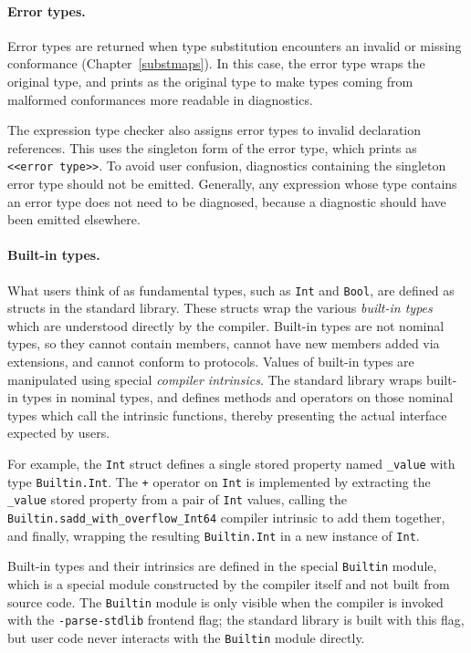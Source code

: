 \documentclass[../generics]{subfiles}
\begin{document}
\paragraph{Error types.}
Error types are returned when type substitution encounters an invalid or missing conformance (Chapter~\ref{substmaps}). In this case, the error type wraps the original type, and prints as the original type to make types coming from malformed conformances more readable in diagnostics.

The expression type checker also assigns error types to invalid declaration references. This uses the singleton form of the error type, which prints as \texttt{<<error~type>>}. To avoid user confusion, diagnostics containing the singleton error type should not be emitted. Generally, any expression whose type contains an error type does not need to be diagnosed, because a diagnostic should have been emitted elsewhere.

\paragraph{Built-in types.}
What users think of as fundamental types, such as \texttt{Int} and \texttt{Bool}, are defined as structs in the standard library. These structs wrap the various \emph{built-in types} which are understood directly by the compiler. Built-in types are not nominal types, so they cannot contain members, cannot have new members added via extensions, and cannot conform to protocols. Values of built-in types are manipulated using special \emph{compiler intrinsics}. The standard library wraps built-in types in nominal types, and defines methods and operators on those nominal types which call the intrinsic functions, thereby presenting the actual interface expected by users.

For example, the \texttt{Int} struct defines a single stored property named \texttt{\_value} with type \texttt{Builtin.Int}. The \texttt{+} operator on \texttt{Int} is implemented by extracting the \texttt{\_value} stored property from a pair of \texttt{Int} values, calling the \texttt{Builtin.sadd\_with\_overflow\_Int64} compiler intrinsic to add them together, and finally, wrapping the resulting \texttt{Builtin.Int} in a new instance of \texttt{Int}.

Built-in types and their intrinsics are defined in the special \texttt{Builtin} module, which is a special module constructed by the compiler itself and not built from source code. The \texttt{Builtin} module is only visible when the compiler is invoked with the \texttt{-parse-stdlib} frontend flag; the standard library is built with this flag, but user code never interacts with the \texttt{Builtin} module directly.
\end{document}
